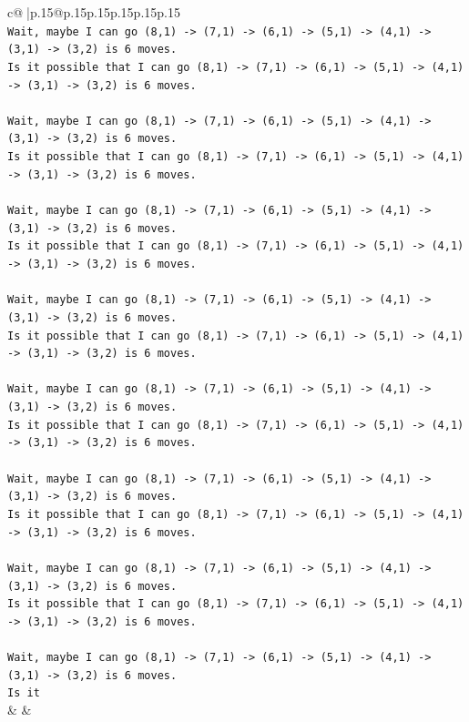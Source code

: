 \documentclass{article}
\begin{document}
{\begin{supertabular}{c@{$\;$}|p{.15\linewidth}@{}p{.15\linewidth}p{.15\linewidth}p{.15\linewidth}p{.15\linewidth}p{.15\linewidth}}
{{{\\ 
\texttt{Wait, maybe I can go (8,1) {-}> (7,1) {-}> (6,1) {-}> (5,1) {-}> (4,1) {-}> (3,1) {-}> (3,2) is 6 moves.} \\
\texttt{Is it possible that I can go (8,1) {-}> (7,1) {-}> (6,1) {-}> (5,1) {-}> (4,1) {-}> (3,1) {-}> (3,2) is 6 moves.} \\
\\ 
\texttt{Wait, maybe I can go (8,1) {-}> (7,1) {-}> (6,1) {-}> (5,1) {-}> (4,1) {-}> (3,1) {-}> (3,2) is 6 moves.} \\
\texttt{Is it possible that I can go (8,1) {-}> (7,1) {-}> (6,1) {-}> (5,1) {-}> (4,1) {-}> (3,1) {-}> (3,2) is 6 moves.} \\
\\ 
\texttt{Wait, maybe I can go (8,1) {-}> (7,1) {-}> (6,1) {-}> (5,1) {-}> (4,1) {-}> (3,1) {-}> (3,2) is 6 moves.} \\
\texttt{Is it possible that I can go (8,1) {-}> (7,1) {-}> (6,1) {-}> (5,1) {-}> (4,1) {-}> (3,1) {-}> (3,2) is 6 moves.} \\
\\ 
\texttt{Wait, maybe I can go (8,1) {-}> (7,1) {-}> (6,1) {-}> (5,1) {-}> (4,1) {-}> (3,1) {-}> (3,2) is 6 moves.} \\
\texttt{Is it possible that I can go (8,1) {-}> (7,1) {-}> (6,1) {-}> (5,1) {-}> (4,1) {-}> (3,1) {-}> (3,2) is 6 moves.} \\
\\ 
\texttt{Wait, maybe I can go (8,1) {-}> (7,1) {-}> (6,1) {-}> (5,1) {-}> (4,1) {-}> (3,1) {-}> (3,2) is 6 moves.} \\
\texttt{Is it possible that I can go (8,1) {-}> (7,1) {-}> (6,1) {-}> (5,1) {-}> (4,1) {-}> (3,1) {-}> (3,2) is 6 moves.} \\
\\ 
\texttt{Wait, maybe I can go (8,1) {-}> (7,1) {-}> (6,1) {-}> (5,1) {-}> (4,1) {-}> (3,1) {-}> (3,2) is 6 moves.} \\
\texttt{Is it possible that I can go (8,1) {-}> (7,1) {-}> (6,1) {-}> (5,1) {-}> (4,1) {-}> (3,1) {-}> (3,2) is 6 moves.} \\
\\ 
\texttt{Wait, maybe I can go (8,1) {-}> (7,1) {-}> (6,1) {-}> (5,1) {-}> (4,1) {-}> (3,1) {-}> (3,2) is 6 moves.} \\
\texttt{Is it possible that I can go (8,1) {-}> (7,1) {-}> (6,1) {-}> (5,1) {-}> (4,1) {-}> (3,1) {-}> (3,2) is 6 moves.} \\
\\ 
\texttt{Wait, maybe I can go (8,1) {-}> (7,1) {-}> (6,1) {-}> (5,1) {-}> (4,1) {-}> (3,1) {-}> (3,2) is 6 moves.} \\
\texttt{Is it} \\
            }
        }
    }
    & & \\ \\


\end{supertabular}}
\end{document}

